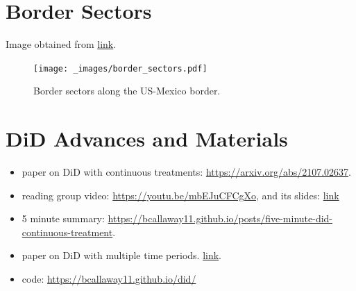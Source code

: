 \documentclass[titlepage]{article}
\begin{document}
\section{Border Sectors}
Image obtained from \href{https://www.reddit.com/r/MapPorn/comments/xqku83/map_of_southwestern_border_of_the_us_with_mexico/}{link}.

\begin{figure}[H]
\centering
    \caption{Border sectors along the US-Mexico border.} 
    \label{fig:border_sectors} 
    \texttt{[image: \_images/border\_sectors.pdf]}
\end{figure}

\section{DiD Advances and Materials}

\begin{itemize}
    \item \cite{callaway2021differenceindifferences} paper on DiD with continuous treatments: \href{https://arxiv.org/abs/2107.02637}{https://arxiv.org/abs/2107.02637}.
    \item \cite{callaway2021differenceindifferences} reading group video:
    \href{https://youtu.be/mbEJuCFCgXo}{https://youtu.be/mbEJuCFCgXo}, and its slides: \href{https://bcallaway11.github.io/files/DID-Continuous-Treatment/slides/did_reading_group.html#1}{link}
    \item \cite{callaway2021differenceindifferences} 5 minute summary: \href{https://bcallaway11.github.io/posts/five-minute-did-continuous-treatment}{https://bcallaway11.github.io/posts/five-minute-did-continuous-treatment}.
    \item \cite{Callaway2021} paper on DiD with multiple time periods. \href{https://www.sciencedirect.com/science/article/abs/pii/S0304407620303948?via%3Dihub}{link}.
    \item \cite{Callaway2021} code: \href{https://bcallaway11.github.io/did/}{https://bcallaway11.github.io/did/}
    
\end{itemize}
\end{document}

